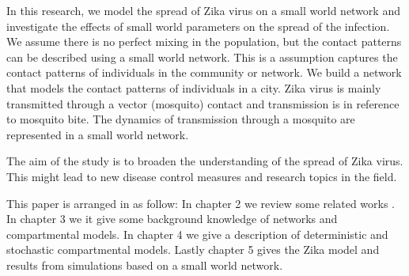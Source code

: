 In this research, we model the spread of Zika virus on a small world network and investigate the effects of small world parameters on the spread of the infection. We assume there is no perfect mixing in the population, but the contact patterns  can be described using a small world network. This is a  assumption captures the contact patterns of individuals in the community or network.  We build a network that models the contact patterns of individuals in a city.
Zika virus is mainly transmitted through a vector (mosquito) contact and transmission is in reference to mosquito bite. The dynamics of transmission through a mosquito are represented in a small world network.

The aim of the study is to broaden the understanding of the spread of Zika virus. This might lead to new disease control measures and research topics in the field.

This paper is arranged in as follow: In chapter 2 we review some related works . In chapter 3 we  it give some background knowledge of networks and compartmental models. In chapter 4 we  give a description of deterministic and stochastic compartmental models. Lastly chapter 5 gives the Zika model and results from simulations based on a small world network.


